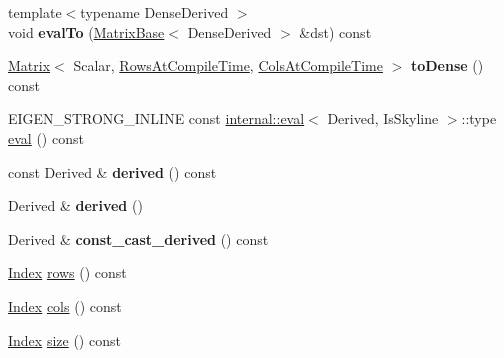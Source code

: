 \begin{DoxyCompactItemize}
{\footnotesize template$<$typename Dense\+Derived $>$ }\\void {\bfseries eval\+To} (\hyperlink{group___core___module_class_eigen_1_1_matrix_base}{Matrix\+Base}$<$ Dense\+Derived $>$ \&dst) const
\item 
\mbox{\label{class_eigen_1_1_skyline_matrix_base_a2fd454562f9f3517bedeb606ff42f3ef}} 
\hyperlink{group___core___module_class_eigen_1_1_matrix}{Matrix}$<$ Scalar, \hyperlink{class_eigen_1_1_skyline_matrix_base_a811ba3961cb927ae5fa84ed278ebceeaa22b71b821112b0ccf61b7317b9ac4cf4}{Rows\+At\+Compile\+Time}, \hyperlink{class_eigen_1_1_skyline_matrix_base_a811ba3961cb927ae5fa84ed278ebceeaa0bb8b9ae248b86ca53aff754311111e8}{Cols\+At\+Compile\+Time} $>$ {\bfseries to\+Dense} () const
\item 
E\+I\+G\+E\+N\+\_\+\+S\+T\+R\+O\+N\+G\+\_\+\+I\+N\+L\+I\+NE const \hyperlink{struct_eigen_1_1internal_1_1eval}{internal\+::eval}$<$ Derived, Is\+Skyline $>$\+::type \hyperlink{class_eigen_1_1_skyline_matrix_base_a03d2346d1bc95c63405e03b6a39d2f7e}{eval} () const
\item 
\mbox{\label{class_eigen_1_1_skyline_matrix_base_a854b1648519580b953e608018f467bcf}} 
const Derived \& {\bfseries derived} () const
\item 
\mbox{\label{class_eigen_1_1_skyline_matrix_base_a557f6ad3ed3e9deddff8721c1ab05ce2}} 
Derived \& {\bfseries derived} ()
\item 
\mbox{\label{class_eigen_1_1_skyline_matrix_base_a435a0804e6832db6b5df601a51707ace}} 
Derived \& {\bfseries const\+\_\+cast\+\_\+derived} () const
\item 
\hyperlink{group___core___module_a554f30542cc2316add4b1ea0a492ff02}{Index} \hyperlink{class_eigen_1_1_skyline_matrix_base_a8243b2fe6bcc6c3037717fcb0afa9d46}{rows} () const
\item 
\hyperlink{group___core___module_a554f30542cc2316add4b1ea0a492ff02}{Index} \hyperlink{class_eigen_1_1_skyline_matrix_base_aff9cfadb45ffbae8a33b710bc9b49d71}{cols} () const
\item 
\hyperlink{group___core___module_a554f30542cc2316add4b1ea0a492ff02}{Index} \hyperlink{class_eigen_1_1_skyline_matrix_base_a635234baea6bd59f97e6bd219adbdb64}{size} () const
\item 

\end{DoxyCompactItemize}
